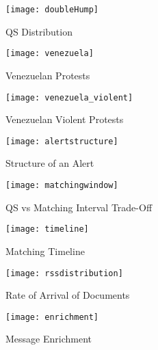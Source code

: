 \begin{figure}
    \texttt{[image: doubleHump]}
    \caption{QS Distribution}
    \label{fig:doubleHump}
\end{figure}

\begin{figure}
    \texttt{[image: venezuela]}
    \caption{Venezuelan Protests}
    \label{fig:venezuela_feb}
\end{figure}

\begin{figure}
    \texttt{[image: venezuela\_violent]}
    \caption{Venezuelan Violent Protests}
    \label{fig:venezuela_violent}
\end{figure}
\begin{figure}
    \texttt{[image: alertstructure]}
    \caption{Structure of an Alert}
    \label{fig:alertstructure}
\end{figure}
\begin{figure}
    \texttt{[image: matchingwindow]}
    \caption{QS vs Matching Interval Trade-Off}
    \label{fig:matchinginterval}
\end{figure}
\begin{figure}
    \texttt{[image: timeline]}
    \caption{Matching Timeline}
    \label{fig:timeline}
\end{figure}
\begin{figure}
    \texttt{[image: rssdistribution]}
    \caption{Rate of Arrival of Documents}
    \label{fig:rssdistribution}
\end{figure}
\begin{figure}
    \texttt{[image: enrichment]}
    \caption{Message Enrichment}
    \label{fig:enrichment}
\end{figure}
















